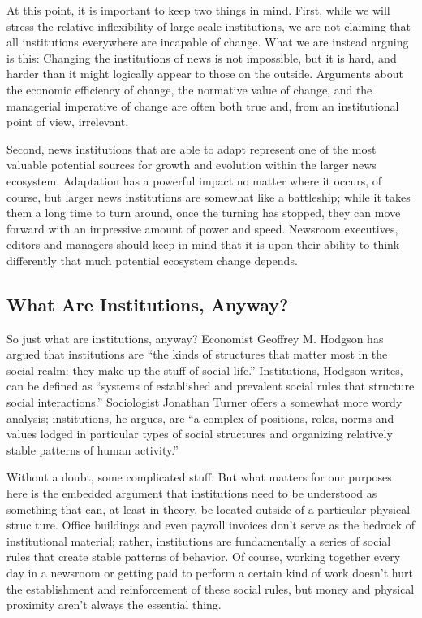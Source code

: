 At this point, it is important to keep two things in mind. First, while we will
stress the relative inflexibility of large-scale institutions, we are not claiming that
all institutions everywhere are incapable of change. What we are instead arguing
is this: Changing the institutions of news is not impossible, but it is hard, and
harder than it might logically appear to those on the outside. Arguments about
the economic efficiency of change, the normative value of change, and the
managerial imperative of change are often both true and, from an institutional
point of view, irrelevant.

Second, news institutions that are able to adapt represent one of the most valuable
potential sources for growth and evolution within the larger news ecosystem.
Adaptation has a powerful impact no matter where it occurs, of course,
but larger news institutions are somewhat like a battleship; while it takes them a
long time to turn around, once the turning has stopped, they can move forward
with an impressive amount of power and speed. Newsroom executives, editors
and managers should keep in mind that it is upon their ability to think differently
that much potential ecosystem change depends.

\subsection{What Are Institutions, Anyway?}

So just what are institutions, anyway? Economist Geoffrey M. Hodgson has
argued that institutions are ``the kinds of structures that matter most in the social
realm: they make up the stuff of social life.'' Institutions, Hodgson writes, can be
defined as ``systems of established and prevalent social rules that structure social
interactions.'' Sociologist Jonathan Turner offers a somewhat more wordy analysis;
institutions, he argues, are ``a complex of positions, roles, norms and values
lodged in particular types of social structures and organizing relatively stable patterns
of human activity.''

Without a doubt, some complicated stuff. But what matters for our purposes
here is the embedded argument that institutions need to be understood as something
that can, at least in theory, be located outside of a particular physical struc ture. Office buildings and even payroll invoices don’t serve as the bedrock of
institutional material; rather, institutions are fundamentally a series of social rules
that create stable patterns of behavior. Of course, working together every day in
a newsroom or getting paid to perform a certain kind of work doesn’t hurt the
establishment and reinforcement of these social rules, but money and physical
proximity aren’t always the essential thing.

